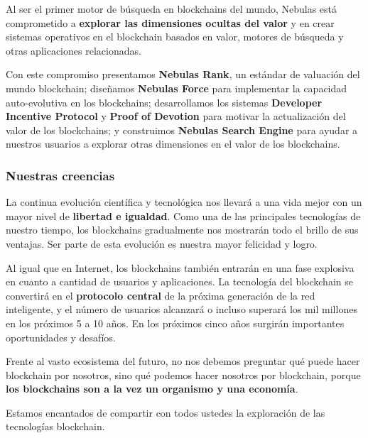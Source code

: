 Al ser el primer motor de búsqueda en blockchains del mundo, Nebulas está comprometido a \textbf{explorar las dimensiones ocultas del valor} y en crear sistemas operativos en el blockchain basados en valor, motores de búsqueda y otras aplicaciones relacionadas.

Con este compromiso presentamos \textbf{Nebulas Rank}, un estándar de valuación del mundo blockchain; diseñamos \textbf{Nebulas Force} para implementar la capacidad auto-evolutiva en los blockchains; desarrollamos los sistemas \textbf{Developer Incentive Protocol} y \textbf{Proof of Devotion} para motivar la actualización del valor de los blockchains; y construimos \textbf{Nebulas Search Engine} para ayudar a nuestros usuarios a explorar otras dimensiones en el valor de los blockchains.

\subsubsection*{Nuestras creencias}

La continua evolución científica y tecnológica nos llevará a una vida mejor con un mayor nivel de \textbf{libertad e igualdad}. Como una de las principales tecnologías de nuestro tiempo, los blockchains gradualmente nos mostrarán todo el brillo de sus ventajas. Ser parte de esta evolución es nuestra mayor felicidad y logro.

Al igual que en Internet, los blockchains también entrarán en una fase explosiva en cuanto a cantidad de usuarios y aplicaciones. La tecnología del blockchain se convertirá en el \textbf{protocolo central} de la próxima generación de la red inteligente, y el número de usuarios alcanzará o incluso superará los mil millones en los próximos 5 a 10 años. En los próximos cinco años surgirán importantes oportunidades y desafíos.

Frente al vasto ecosistema del futuro, no nos debemos preguntar qué puede hacer blockchain por nosotros, sino qué podemos hacer nosotros por blockchain, porque \textbf{los blockchains son a la vez un organismo y una economía}.

Estamos encantados de compartir con todos ustedes la exploración de las tecnologías blockchain.